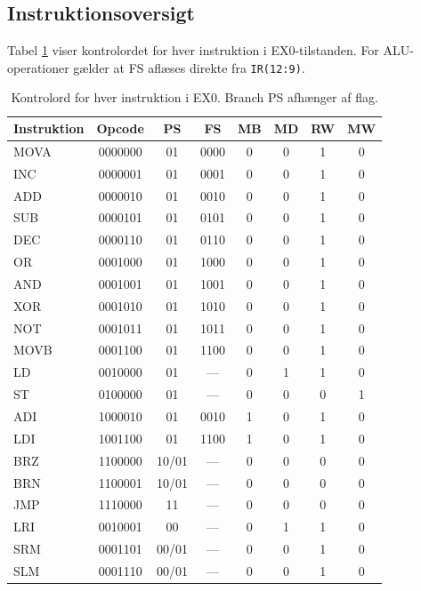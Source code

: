 \documentclass{article}
\begin{document}
\subsection{Instruktionsoversigt}
\label{sec:idc-instructions}

Tabel \ref{tab:idc-controlword} viser kontrolordet for hver instruktion i EX0-tilstanden.
For ALU-operationer gælder at FS aflæses direkte fra \texttt{IR(12:9)}.

\begin{table}[H]
\centering
\footnotesize
\begin{tabular}{|l|c|c|c|c|c|c|c|}
\hline
\textbf{Instruktion} & \textbf{Opcode} & \textbf{PS} & \textbf{FS} & \textbf{MB} & \textbf{MD} & \textbf{RW} & \textbf{MW} \\
\hline
MOVA  & 0000000 & 01 & 0000 & 0 & 0 & 1 & 0 \\
INC   & 0000001 & 01 & 0001 & 0 & 0 & 1 & 0 \\
ADD   & 0000010 & 01 & 0010 & 0 & 0 & 1 & 0 \\
SUB   & 0000101 & 01 & 0101 & 0 & 0 & 1 & 0 \\
DEC   & 0000110 & 01 & 0110 & 0 & 0 & 1 & 0 \\
OR    & 0001000 & 01 & 1000 & 0 & 0 & 1 & 0 \\
AND   & 0001001 & 01 & 1001 & 0 & 0 & 1 & 0 \\
XOR   & 0001010 & 01 & 1010 & 0 & 0 & 1 & 0 \\
NOT   & 0001011 & 01 & 1011 & 0 & 0 & 1 & 0 \\
MOVB  & 0001100 & 01 & 1100 & 0 & 0 & 1 & 0 \\
\hline
LD    & 0010000 & 01 & ---  & 0 & 1 & 1 & 0 \\
ST    & 0100000 & 01 & ---  & 0 & 0 & 0 & 1 \\
ADI   & 1000010 & 01 & 0010 & 1 & 0 & 1 & 0 \\
LDI   & 1001100 & 01 & 1100 & 1 & 0 & 1 & 0 \\
\hline
BRZ   & 1100000 & 10/01 & --- & 0 & 0 & 0 & 0 \\
BRN   & 1100001 & 10/01 & --- & 0 & 0 & 0 & 0 \\
JMP   & 1110000 & 11 & ---  & 0 & 0 & 0 & 0 \\
\hline
LRI   & 0010001 & 00 & ---  & 0 & 1 & 1 & 0 \\
SRM   & 0001101 & 00/01 & --- & 0 & 0 & 1 & 0 \\
SLM   & 0001110 & 00/01 & --- & 0 & 0 & 1 & 0 \\
\hline
\end{tabular}
\caption{Kontrolord for hver instruktion i EX0. Branch PS afhænger af flag.}
\label{tab:idc-controlword}
\end{table}
\end{document}
